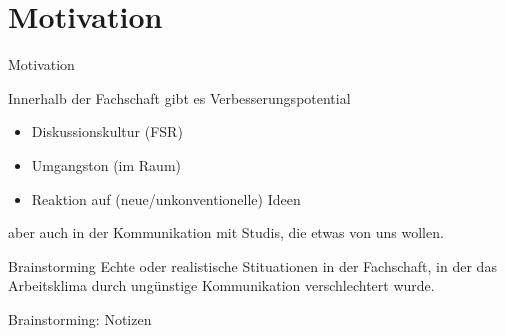 \section{Motivation}

\begin{frame}[c]{Motivation}

    Innerhalb der Fachschaft gibt es Verbesserungspotential 
        
    \begin{itemize}[<+(1)->]
        \item Diskussionskultur (FSR)
        \item Umgangston (im Raum)
        \item Reaktion auf (neue/unkonventionelle) Ideen
    \end{itemize}
    \pause

    aber auch in der Kommunikation mit Studis, die etwas von uns wollen.

    \pause

    \begin{block}{Brainstorming}%
        Echte oder realistische Stituationen in der Fachschaft, in der das
        Arbeitsklima durch ungünstige Kommunikation verschlechtert wurde.
    \end{block}
\end{frame}


\begin{frame}[c]{Brainstorming: Notizen}
    
\end{frame}
